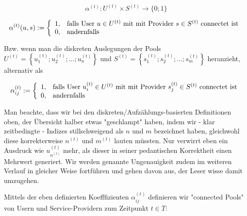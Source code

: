 \begin{Def}\label{defKoeff}

\begin{equation*}
  \alpha^{(t)} : U^{(t)} \times S^{(t)} \rightarrow \{0; 1\} 
\end{equation*}

\[
\alpha^{(t)}(u, s):=\left\{%
\begin{array}{ll}
    1, & \hbox{falls User $u \in U^{(t)}$ mit mit Provider $s \in S^{(t)}$ connectet ist} \\
    0, & \hbox{andernfalls} \\
\end{array}%
\right.
\]

\vspace{1cm}

Bzw. wenn man die diskreten Auslegungen der Pools $U^{(t)} = \left\{ u^{(t)}_1; u^{(t)}_2;...; u^{(t)}_{n} \right\}$ und $S^{(t)} = \left\{ s^{(t)}_1; s^{(t)}_2;...; s^{(t)}_{m} \right\}$ heranzieht, alternativ als

\[
\alpha^{(t)}_{ij}:=\left\{%
\begin{array}{ll}
    1, & \hbox{falls User $u^{(t)}_i \in U^{(t)}$ mit mit Provider $s^{(t)}_j \in S^{(t)}$ connectet ist} \\
    0, & \hbox{andernfalls} \\
\end{array}%
\right.
\]

\end{Def}

\vspace{1cm}

Man beachte, dass wir bei den diskreten/Aufzählungs-basierten Definitionen oben, der Übersicht halber etwas "geschlampt" haben, indem wir - klar zeitbedingte - Indizes stillschweigend als $n$ und $m$ bezeichnet haben, gleichwohl diese korrekterweise $n^{(t)}$ und $m^{(t)}$ lauten müssten. Nur verwirrt eben ein Ausdruck wie $u^{(t)}_{n^{(t)}}$ mehr, als dieser in seiner pedantischen Korrektheit einen Mehrwert generiert. Wir werden genannte Ungenauigkeit zudem im weiteren Verlauf in gleicher Weise fortführen und gehen davon aus, der Leser wisse damit umzugehen. 

\vspace{0.3cm}

Mittels der eben definierten Koefffizienten $\alpha^{(t)}_{ij}$ definieren wir "connected Pools" von Usern und Service-Providern zum Zeitpunkt $t \in T$:

\vspace{0.3cm}

